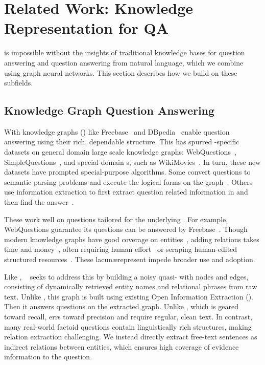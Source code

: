 \section{Related Work: Knowledge Representation for QA}
\label{sec:bg}

\name{} is impossible without the insights of 
traditional knowledge bases for question answering and question
answering from natural language, which we combine using graph neural
networks.
%
This section describes how we build on these subfields.

\subsection{Knowledge Graph Question Answering}

With knowledge graphs () like
Freebase~\cite{bollacker2008freebase} and
DBpedia~\cite{mendes2011dbpedia} enable question answering using their
rich, dependable structure.
%
This has spurred -specific  datasets on general domain
large scale knowledge graphs: WebQuestions~\cite{berant2013semantic},
SimpleQuestions~\cite{bordes2015large}, and special-domain s,
such as WikiMovies~\cite{miller2016key}.
%
In turn, these new datasets have prompted special-purpose 
 algorithms.
%
Some convert questions to semantic parsing problems and execute the
logical forms on the graph~\cite{cai2013large, kwiatkowski2013scaling,
  reddy2014large, yih2015semantic}.
%
Others use information extraction
 to first extract question related information in 
and then find the answer~\cite{bao2014knowledge, yao2014information,
  gardner2017open}.

These work well on questions tailored for the underlying .
%
For example,
WebQuestions guarantee its questions can be answered by
Freebase~\cite{berant2013semantic}.
%
Though modern knowledge graphs have good coverage on
entities~\cite{cxthesis}, adding relations takes time and
money~\cite{Paulheim2018HowMI}, often requiring human
effort~\cite{bollacker2008freebase} or scraping human-edited
structured resources~\cite{mendes2011dbpedia}.
%
These lacun\ae represent impede broader use and
adoption.

Like \name{}, ~\cite{Lu:2019:ACQ} seeks to address this by
building a noisy quasi- with nodes and edges, consisting of
dynamically retrieved entity names and relational phrases from raw
text.
%
Unlike \name{}, this graph is built using existing Open Information
Extraction ().
%
Then it answers questions on the extracted graph.
%
Unlike \name{}, which is geared toward recall,  errs toward
precision and require regular, clean text.
%
In contrast, many real-world factoid questions contain linguistically
rich structures, making relation extraction challenging.
%
We instead directly extract free-text sentences as indirect relations
between entities, which ensures high coverage of evidence information
to the question.



